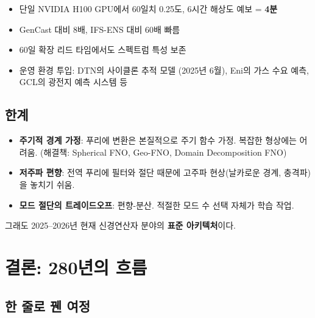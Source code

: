 \documentclass[11pt,a4paper]{article}
\begin{document}
\begin{itemize}
\item 단일 NVIDIA H100 GPU에서 60일치 0.25도, 6시간 해상도 예보 = \textbf{4분}
\item GenCast 대비 8배, IFS-ENS 대비 60배 빠름
\item 60일 확장 리드 타임에서도 스펙트럼 특성 보존
\item 운영 환경 투입: DTN의 사이클론 추적 모델 (2025년 6월), Eni의 가스 수요 예측, GCL의 광전지 예측 시스템 등
\end{itemize}

\subsection{한계}

\begin{itemize}
\item \textbf{주기적 경계 가정}: 푸리에 변환은 본질적으로 주기 함수 가정. 복잡한 형상에는 어려움. (해결책: Spherical FNO, Geo-FNO, Domain Decomposition FNO)
\item \textbf{저주파 편향}: 전역 푸리에 필터와 절단 때문에 고주파 현상(날카로운 경계, 충격파)을 놓치기 쉬움.
\item \textbf{모드 절단의 트레이드오프}: 편향-분산. 적절한 모드 수 선택 자체가 학습 작업.
\end{itemize}

그래도 2025--2026년 현재 신경연산자 분야의 \textbf{표준 아키텍처}이다.

\section{결론: 280년의 흐름}

\subsection{한 줄로 꿴 여정}
\end{document}
